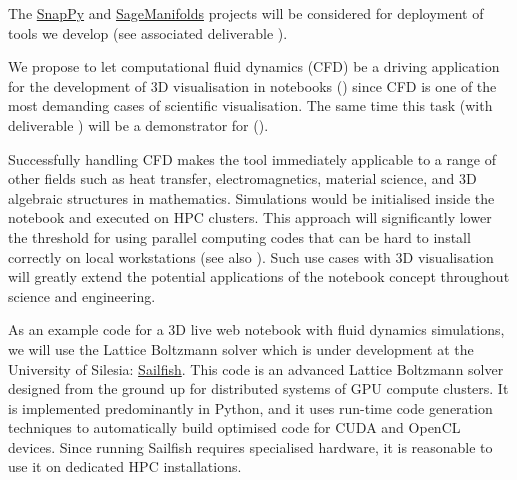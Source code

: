 \begin{workpackage}
\begin{tasklist}
\begin{task}[title=Visualisation system for 3D data in web-notebook
,id=vis3d,lead=SR, partners={US,PS,USO}, PM=13, wphases=0-24, issue=76]
The \href{http://www.math.uic.edu/t3m/SnapPy/}{SnapPy} and
\href{http://sagemanifolds.obspm.fr/}{SageManifolds} projects will be
considered for deployment of tools we develop (see associated
deliverable ).
\end{task}


\begin{task}[title=Visualisation of 3D fluid dynamics data in web-notebook
,id=cfd-vis,lead=SR, partners={US,PS,USO,XFEL},PM=5,wphases=12-36,issue=77]

We propose to let computational fluid dynamics (CFD) be a driving
application for the development of 3D visualisation in \Jupyter
notebooks () since CFD is one of the most demanding
cases of scientific visualisation. The same time this task
(with deliverable ) will be
a demonstrator for ().

Successfully handling CFD makes the tool immediately applicable to a
range of other fields such as heat transfer, electromagnetics,
material science, and 3D algebraic structures in
mathematics. Simulations would be initialised inside the notebook and
executed on HPC clusters. This approach will significantly lower the
threshold for using parallel computing codes that can be hard to
install correctly on local workstations (see also ). Such
use cases with 3D visualisation will greatly extend the potential
applications of the \Jupyter notebook concept throughout science and
engineering.

As an example code for a 3D live web notebook with fluid dynamics
simulations, we will use the Lattice Boltzmann solver which is under
development at the University of Silesia:
\href{http://sailfish.us.edu.pl/}{Sailfish}.  This code is an advanced
Lattice Boltzmann solver designed from the ground up for distributed
systems of GPU compute clusters. It is implemented predominantly in
Python, and it uses run-time code generation techniques to
automatically build optimised code for CUDA and OpenCL devices. Since
running Sailfish requires specialised hardware, it is reasonable to
use it on dedicated HPC installations.
\end{task}

\begin{task}[lead=UB,title=Common option system for various displays
  in Sage,id=Sage-display,PM=12,wphases=0-24,issue=78]


\end{task}
\end{tasklist}
\end{workpackage}
